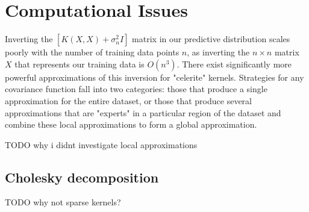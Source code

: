 \section{Computational Issues}

Inverting the $[K(X,X) + \sigma^2_nI]$ matrix in our predictive distribution scales poorly with the number of training data points $n$, as inverting the $n \times n$ matrix $X$ that represents our training data is $O(n^3)$. There exist significantly more powerful approximations of this inversion for "celerite" kernels. Strategies for any covariance function fall into two categories: those that produce a single approximation for the entire dataset, or those that produce several approximations that are "experts" in a particular region of the dataset and combine these local approximations to form a global approximation.

TODO why i didnt investigate local approximations 




\subsection{Cholesky decomposition}
TODO why not sparse kernels?

